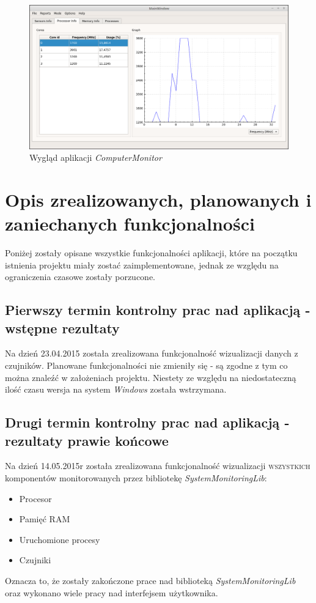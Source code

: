 \documentclass[a4paper]{article}
\begin{document}
\begin{figure}[H]
	\centering
	\includegraphics[width=\linewidth]{img/wygladAplikacji.png}
	\caption{Wygląd aplikacji \textit{ComputerMonitor}}
	\label{wygladAplikacji}
\end{figure}




\section{Opis zrealizowanych, planowanych i zaniechanych funkcjonalności}

Poniżej zostały opisane wszystkie funkcjonalności aplikacji, które na początku istnienia projektu
miały zostać zaimplementowane, jednak ze względu na ograniczenia czasowe zostały porzucone.

\subsection{Pierwszy termin kontrolny prac nad aplikacją - wstępne rezultaty}

Na dzień 23.04.2015 została zrealizowana funkcjonalność wizualizacji danych z czujników. Planowane funkcjonalności nie zmieniły się - są zgodne z tym co można znaleźć w założeniach projektu. Niestety ze względu na niedostateczną ilość czasu wersja na system \textit{Windows} została wstrzymana.

\subsection{Drugi termin kontrolny prac nad aplikacją - rezultaty prawie końcowe}
Na dzień 14.05.2015r została zrealizowana funkcjonalność wizualizacji \textsc{wszystkich} komponentów monitorowanych przez bibliotekę \textit{SystemMonitoringLib}:
	\begin{itemize}
		\item Procesor
		\item Pamięć \textsc{RAM}
		\item Uruchomione procesy
		\item Czujniki
	\end{itemize}
Oznacza to, że zostały zakończone prace nad biblioteką \textit{SystemMonitoringLib} oraz wykonano wiele pracy nad interfejsem użytkownika.
\end{document}
